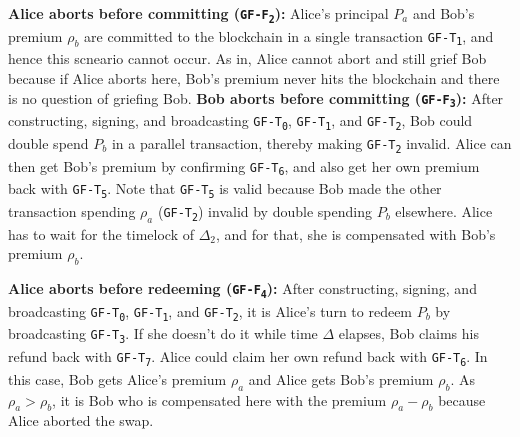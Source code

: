\bigbreak
\noindent
\textbf{Alice aborts before committing  (\texttt{GF-F\textsubscript{2}}):}
Alice's principal $P_a$ and Bob's premium $\rho_b$ are committed to the blockchain in a single transaction \texttt{GF-T\textsubscript{1}}, and hence this scneario cannot occur. As in, Alice cannot abort and still grief Bob because if Alice aborts here, Bob's premium never hits the blockchain and there is no question of griefing Bob.
\bigbreak
\noindent
\textbf{Bob aborts before committing (\texttt{GF-F\textsubscript{3}}):}
After constructing, signing, and broadcasting \texttt{GF-T\textsubscript{0}}, \texttt{GF-T\textsubscript{1}}, and \texttt{GF-T\textsubscript{2}}, Bob could double spend $P_b$ in a parallel transaction, thereby making \texttt{GF-T\textsubscript{2}} invalid. Alice can then get Bob's premium by confirming \texttt{GF-T\textsubscript{6}}, and also get her own premium back with \texttt{GF-T\textsubscript{5}}. Note that \texttt{GF-T\textsubscript{5}} is valid because Bob made the other transaction spending $\rho_a$ (\texttt{GF-T\textsubscript{2}}) invalid by double spending $P_b$ elsewhere. Alice has to wait for the timelock of $\Delta_2$, and for that, she is compensated with Bob's premium $\rho_b$.

\bigbreak
\noindent
\textbf{Alice aborts before redeeming (\texttt{GF-F\textsubscript{4}}):}
After constructing, signing, and broadcasting \texttt{GF-T\textsubscript{0}}, \texttt{GF-T\textsubscript{1}}, and \texttt{GF-T\textsubscript{2}}, it is Alice's turn to redeem $P_b$ by broadcasting \texttt{GF-T\textsubscript{3}}. If she doesn't do it while time $\Delta$ elapses, Bob claims his refund back with \texttt{GF-T\textsubscript{7}}. Alice could claim her own refund back with \texttt{GF-T\textsubscript{6}}. In this case, Bob gets Alice's premium $\rho_a$ and Alice gets Bob's premium $\rho_b$. As $\rho_a > \rho_b$, it is Bob who is compensated here with the premium $\rho_a - \rho_b$ because Alice aborted the swap.

